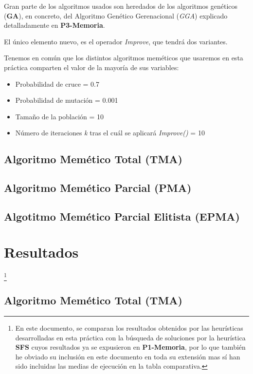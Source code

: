 \documentclass[a4paper, 11pt]{article}
\begin{document}
			Gran parte de los algoritmos usados son heredados de los algoritmos genéticos (\textbf{GA}),
			en concreto, del Algoritmo Genético Gerenacional (\textit{GGA}) explicado detalladamente en
			\textbf{P3-Memoria}.
			
			El único elemento nuevo, es el operador \textit{Improve}, que tendrá dos variantes.
			
			Tenemos en común que los distintos algoritmos meméticos que usaremos en esta práctica comparten
			el valor de la mayoría de sus variables:
			\begin{itemize}
				\item Probabilidad de cruce = 0.7
				\item Probabilidad de mutación = 0.001
				\item Tamaño de la población = 10
				\item Número de iteraciones \textit{k} tras el cuál se aplicará \textit{Improve()} = 10
			\end{itemize}
			
		\subsection{Algoritmo Memético Total (\textbf{TMA})}
		\subsection{Algoritmo Memético Parcial (\textbf{PMA})}
		\subsection{Algotitmo Memético Parcial Elitista (\textbf{EPMA})}
		
	\section{Resultados}\footnote{En este documento, se comparan los resultados obtenidos por las
	heurísticas desarrolladas en esta práctica con la búsqueda de soluciones por la heurística
	\textbf{SFS} cuyos resultados ya se expusieron en \textbf{P1-Memoria}, por lo que también he
	obviado su inclusión en este documento en toda su extensión mas sí han sido incluidas las medias
	de ejecución en la tabla comparativa.}
	
		\subsection{Algoritmo Memético Total (\textbf{TMA})}
			
			
			
\end{document}
